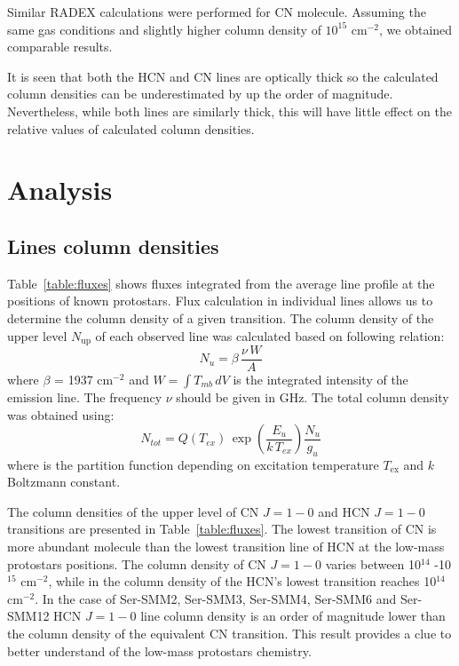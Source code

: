 \documentclass{aa}
\begin{document}
Similar RADEX calculations were performed for CN molecule. Assuming the same gas conditions and slightly higher column density of $10^{15}$ cm$^{-2}$, we obtained comparable results. 

It is seen that both the HCN and CN lines are optically thick so the calculated column densities can be underestimated by up the order of magnitude. Nevertheless, while both lines are similarly thick, this will have little effect on the relative values of calculated column densities. 

\section{Analysis}

\subsection{Lines column densities}

Table~\ref{table:fluxes} shows fluxes integrated from the average line profile at the positions of known protostars. 
Flux calculation in individual lines allows us to determine the column density of a given transition. The column density of the upper level $N_\mathrm{up}$ of each observed line was calculated based on following relation:
\begin{equation} \label{eq2}
N_u = \beta \, \frac{\nu \, W}{A}
\end{equation}
where $\beta$ = 1937 cm$^{-2}$ and $W = \int{T_{mb} \, dV}$ is the integrated intensity of the emission line. The frequency $\nu$ should be given in GHz. The total column density was obtained using:
\begin{equation} \label{eq3}
N_{tot} = Q(T_{ex}) \, \exp(\frac{E_u }{k \, T_{ex} })  \frac{N_u }{g_u }
\end{equation}
where is the partition function depending on excitation temperature $T_\mathrm{ex}$ and $k$ Boltzmann constant.

The column densities of the upper level of CN $J=1-0$ and HCN $J=1-0$ transitions are presented in Table~\ref{table:fluxes}. The lowest transition of CN is more abundant molecule than the lowest transition line of HCN at the low-mass protostars positions. The column density of CN $J=1-0$ varies between 10$^{14}$ -10$^{15}$ cm$^{-2}$, while in the column density of the HCN’s lowest transition reaches 10$^{14}$ cm$^{-2}$. In the case of Ser-SMM2, Ser-SMM3, Ser-SMM4, Ser-SMM6 and Ser-SMM12 HCN $J=1-0$ line column density is an order of magnitude lower than the column density of the equivalent CN transition. This result provides a clue to better understand of the low-mass protostars chemistry. 
\end{document}
